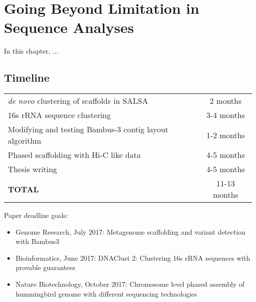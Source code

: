 
\chapter{Going Beyond Limitation in Sequence Analyses}

In this chapter, ...




\section{Timeline}

\begin{center}
    \begin{tabular}{|l|c|}
        \hline
        \emph{de novo} clustering of scaffolds in SALSA & 2 months \\
        16s rRNA sequence clustering & 3-4 months\\
        Modifying and testing Bambus-3 contig layout algorithm & 1-2 months \\
        Phased scaffolding with Hi-C like data & 4-5 months \\
        Thesis writing & 4-5 months\\
        \hline
        \textbf{TOTAL} & 11-13 months \\
        \hline
    \end{tabular}
\end{center}

Paper deadline goals:

\begin{itemize}
    \item Genome Research, July  2017: Metagenome scaffolding and variant detection with Bambus3
    \item Bioinformatics, June  2017: DNAClust 2: Clustering 16s rRNA sequences with provable guarantees
    \item Nature Biotechnology, October 2017: Chromosome level phased assembly of hummingbird genome with different sequencing technologies
\end{itemize}

